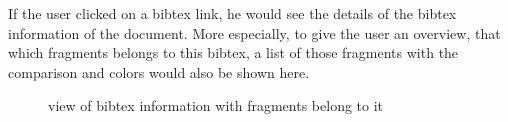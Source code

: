 If the user clicked on a bibtex link, he would see the details of the bibtex information of the document. More especially, to give the user an overview, that which fragments belongs to this bibtex, a list of those fragments with the comparison and colors would also be shown here.

\begin{figure}[!h]
  \centering
  \caption{view of bibtex information with fragments belong to it}
  \label{fig:Bibliography_frag_view}
\end{figure}
